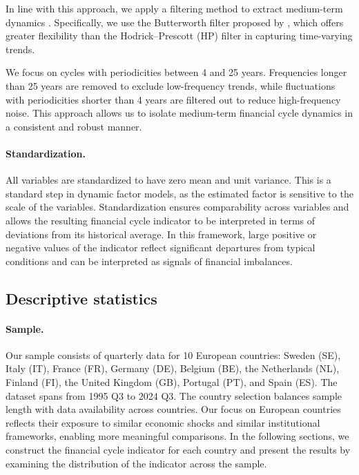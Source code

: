In line with this approach, we apply a filtering method to extract medium-term dynamics \citep{drehmann2012characterising, schuler2020financial}. Specifically, we use the Butterworth filter proposed by \citet{pollock2000trend}, which offers greater flexibility than the Hodrick–Prescott (HP) filter in capturing time-varying trends.

We focus on cycles with periodicities between 4 and 25 years. Frequencies longer than 25 years are removed to exclude low-frequency trends, while fluctuations with periodicities shorter than 4 years are filtered out to reduce high-frequency noise. This approach allows us to isolate medium-term financial cycle dynamics in a consistent and robust manner.

\paragraph{Standardization.}  

All variables are standardized to have zero mean and unit variance. This is a standard step in dynamic factor models, as the estimated factor is sensitive to the scale of the variables. Standardization ensures comparability across variables and allows the resulting financial cycle indicator to be interpreted in terms of deviations from its historical average. In this framework, large positive or negative values of the indicator reflect significant departures from typical conditions and can be interpreted as signals of financial imbalances.

\subsection{Descriptive statistics}

\paragraph{Sample.} Our sample consists of quarterly data for 10 European countries: Sweden (SE), Italy (IT), France (FR), Germany (DE), Belgium (BE), the Netherlands (NL), Finland (FI), the United Kingdom (GB), Portugal (PT), and Spain (ES). The dataset spans from 1995 Q3 to 2024 Q3. The country selection balances sample length with data availability across countries. Our focus on European countries reflects their exposure to similar economic shocks and similar institutional frameworks, enabling more meaningful comparisons. In the following sections, we construct the financial cycle indicator for each country and present the results by examining the distribution of the indicator across the sample.

